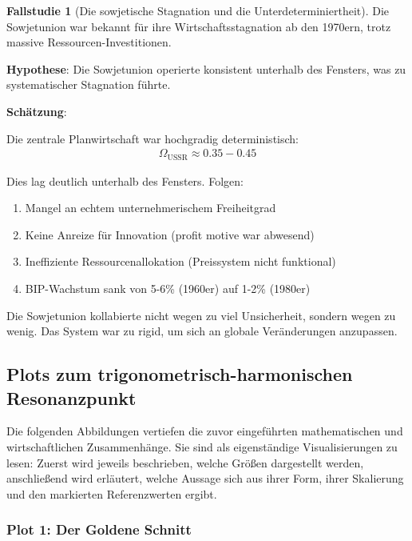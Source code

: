 \documentclass[a4paper,12pt,twoside]{report}
\theoremstyle{definition}
\newtheorem{fallstudie}{Fallstudie}
\begin{document}
\begin{fallstudie}[Die sowjetische Stagnation und die Unterdeterminiertheit]

Die Sowjetunion war bekannt für ihre Wirtschaftsstagnation ab den 1970ern, trotz massive Ressourcen-Investitionen.

\textbf{Hypothese}: Die Sowjetunion operierte konsistent unterhalb des Fensters, was zu systematischer Stagnation führte.

\textbf{Schätzung}:

Die zentrale Planwirtschaft war hochgradig deterministisch:
\begin{align}
\Omega_{\text{USSR}} \approx 0.35-0.45
\end{align}

Dies lag deutlich unterhalb des Fensters. Folgen:
\begin{enumerate}
	\item Mangel an echtem unternehmerischem Freiheitgrad
	\item Keine Anreize für Innovation (profit motive war abwesend)
	\item Ineffiziente Ressourcenallokation (Preissystem nicht funktional)
	\item BIP-Wachstum sank von 5-6\% (1960er) auf 1-2\% (1980er)
\end{enumerate}

Die Sowjetunion kollabierte nicht wegen zu viel Unsicherheit, sondern wegen zu wenig. Das System war zu rigid, um sich an globale Veränderungen anzupassen.

\end{fallstudie}

\subsection{Plots zum trigonometrisch-harmonischen Resonanzpunkt}

Die folgenden Abbildungen vertiefen die zuvor eingeführten mathematischen und wirtschaftlichen Zusammenhänge. Sie sind als eigenständige Visualisierungen zu lesen: Zuerst wird jeweils beschrieben, welche Größen dargestellt werden, anschließend wird erläutert, welche Aussage sich aus ihrer Form, ihrer Skalierung und den markierten Referenzwerten ergibt.

\subsubsection{Plot 1: Der Goldene Schnitt}
\end{document}
